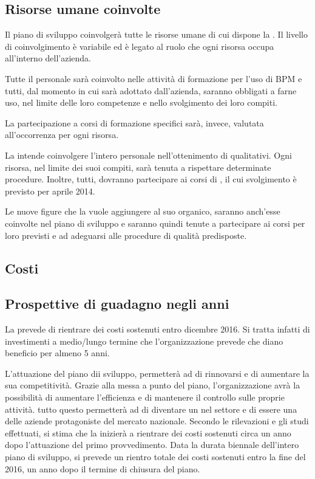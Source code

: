 \subsection{Risorse umane coinvolte}
Il piano di sviluppo coinvolgerà tutte le risorse umane di cui dispone la \customer .
Il livello di coinvolgimento è variabile ed è legato al ruolo che ogni risorsa occupa all'interno dell'azienda.

Tutte il personale sarà coinvolto nelle attività di formazione per l'uso di \sw BPM e tutti, dal momento in cui sarà adottato dall'azienda, saranno obbligati a farne uso, nel limite delle loro competenze e nello svolgimento dei loro compiti.

La partecipazione a corsi di formazione specifici sarà, invece, valutata all'occorrenza per ogni risorsa. 

La \customer intende coinvolgere l'intero personale nell'ottenimento di  qualitativi.
Ogni risorsa, nel limite dei suoi compiti, sarà tenuta a rispettare determinate procedure. Inoltre, tutti, dovranno partecipare ai corsi di , il cui svolgimento è previsto per aprile 2014.


Le nuove figure che la \customer vuole aggiungere al suo organico, saranno anch'esse coinvolte nel piano di sviluppo e saranno quindi tenute a partecipare ai corsi per loro previsti e ad adeguarsi alle procedure di qualità predisposte.

\subsection{Costi}
\subsection{ Prospettive di guadagno negli anni}
La \customer prevede di rientrare dei costi sostenuti entro dicembre 2016. Si tratta infatti di investimenti a medio/lungo termine che l'organizzazione prevede che diano beneficio per almeno 5 anni.

L'attuazione del piano dii sviluppo, permetterà ad  \customer di rinnovarsi e di aumentare la sua competitività. Grazie alla messa a punto del piano, l'organizzazione avrà la possibilità di aumentare l'efficienza e di mantenere il controllo sulle proprie attività. tutto questo permetterà ad \customer di diventare un  nel settore e di essere una delle aziende protagoniste del mercato nazionale. 
Secondo le rilevazioni e gli studi effettuati, si stima che la \customer inizierà a rientrare dei costi sostenuti circa un anno dopo l'attuazione del primo provvedimento. Data la durata biennale dell'intero piano di sviluppo, si prevede un rientro totale dei costi sostenuti entro la fine del 2016, un anno dopo il termine di chiusura del piano.

